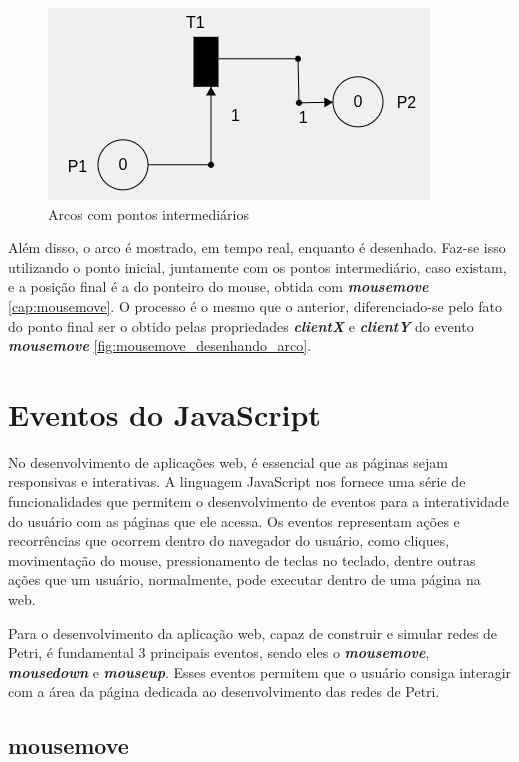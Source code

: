 \documentclass[
	12pt,				%
	openright,			%
	oneside,			%
	a4paper,			%
	english,			%
	brazil				%
	]{abntex2}
\begin{document}
\begin{figure}[ht] 
	\centering
	\includegraphics[scale=0.8]{figuras/arcPontoIntermediario.png}
	\caption[Arco com pontos intermediários]{Arcos com pontos intermediários}
	\label{fig:arcPontoIntermediario}
\end{figure}

Além disso, o arco é mostrado, em tempo real, enquanto é desenhado. Faz-se isso utilizando o ponto inicial, juntamente com os pontos intermediário, caso existam, e a posição final é a do ponteiro do mouse, obtida com \textbf{\textit{mousemove}} \ref{cap:mousemove}. O processo é o mesmo que o anterior, diferenciado-se pelo fato do ponto final ser o obtido pelas propriedades \textbf{\textit{clientX}} e \textbf{\textit{clientY}} do evento \textbf{\textit{mousemove}} \ref{fig:mousemove_desenhando_arco}. 

\section{Eventos do JavaScript}

No desenvolvimento de aplicações web, é essencial que as páginas sejam responsivas e interativas. A linguagem JavaScript nos fornece uma série de funcionalidades que permitem o desenvolvimento de eventos para a interatividade do usuário com as páginas que ele acessa. Os eventos representam ações e recorrências que ocorrem dentro do navegador do usuário, como cliques, movimentação do mouse, pressionamento de teclas no teclado, dentre outras ações que um usuário, normalmente, pode executar dentro de uma página na web. 

Para o desenvolvimento da aplicação web, capaz de construir e simular redes de Petri, é fundamental 3 principais eventos, sendo eles o \textbf{\textit{mousemove}}, \textbf{\textit{mousedown}} e \textbf{\textit{mouseup}}. Esses eventos permitem que o usuário consiga interagir com a área da página dedicada ao desenvolvimento das redes de Petri. 

\subsection*{mousemove}\label{cap:mousemove}
\end{document}
